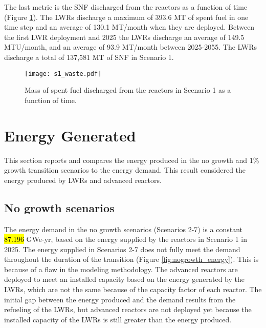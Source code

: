 The last metric is the \gls{SNF} discharged from the reactors as a function of
time (Figure \ref{fig:waste1}). The \glspl{LWR} discharge a maximum of 393.6 MT 
of spent fuel in one time step and an average of 130.1 MT/month when they are 
deployed. Between the first \gls{LWR} deployment and 2025 the \glspl{LWR} 
discharge an average of 149.5 MTU/month, and an average of 93.9 MT/month  
between 2025-2055. The \glspl{LWR} discharge a total of 137,581 MT of \gls{SNF} 
in Scenario 1. 

\begin{figure}
    \centering
    \texttt{[image: s1\_waste.pdf]}
    \caption{Mass of spent fuel discharged from the reactors in Scenario 1 as a function of time.}
    \label{fig:waste1}
\end{figure}

\section{Energy Generated} \label{sec:energy}
This section reports and compares the energy produced in the no growth and 
1\% growth transition scenarios to the energy demand. This result 
considered the energy produced by \glspl{LWR} and advanced reactors. 

\subsection{No growth scenarios}
The energy demand in the no growth scenarios (Scenarios 2-7) is a constant
\hl{87.196} GWe-yr, based on the energy supplied by the reactors in Scenario 1
in 2025. The energy supplied in Scenarios 2-7 does not fully meet the demand
throughout the duration of the transition (Figure \ref{fig:nogrowth_energy}). 
This is because of a flaw in the modeling methodology. The advanced reactors 
are deployed to meet an installed capacity based on the energy generated by 
the \glspl{LWR}, which are not the same because of the capacity factor of 
each reactor. The initial gap between the energy produced and the demand results 
from the refueling of the \glspl{LWR}, but advanced reactors are not deployed 
yet because the installed capacity of the \glspl{LWR} is still greater than 
the energy produced. 

